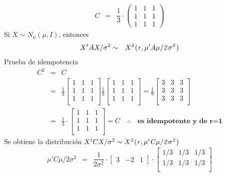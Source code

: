 \documentclass[12pt,a4paper]{report}
\begin{document}
\begin{enumerate}
	 \begin{eqnarray*} C&=& \dfrac{1}{3} \cdot
	 	\begin{pmatrix} 1 & 1 & 1 \\
	 		 			1 & 1 & 1 \\ 1 & 1 & 1 
		\end{pmatrix}
	 \end{eqnarray*}
Si $X\sim N_{n}(\mu, I)$, entonces
	 \begin{eqnarray*}
	 	X^{t}AX/\sigma^{2}&\sim& \it{X^{2}}(r,\mu'A\mu/2\sigma^{2})
	 \end{eqnarray*}
Prueba de idempotencia	 
	 \begin{eqnarray*}
	 	C^{2}&=& C\\
	 	&=&\frac{1}{3}  \begin{bmatrix}
	 		1 & 1 & 1\\
	 		1 & 1 & 1\\
	 		1 & 1 & 1\\
	 	\end{bmatrix}	
	 	\frac{1}{3}  \begin{bmatrix}
	 		1 & 1 & 1\\
	 		1 & 1 & 1\\
	 		1 & 1 & 1\\
	 	\end{bmatrix}
	 	=	\frac{1}{9}	\begin{bmatrix}
	 		3 & 3 & 3\\
	 		3 & 3 & 3\\
	 		3 & 3 & 3\\
	 	\end{bmatrix} \\
	 	&=&	\frac{1}{3} \cdot \begin{bmatrix}
	 		1 & 1 & 1\\
	 		1 & 1 & 1\\
	 		1 & 1 & 1\\
	 	\end{bmatrix} =C \quad \therefore \quad \textbf{es idempotente y de r=1}
	 \end{eqnarray*}
Se obtiene la distribución $X^{t}CX/\sigma^{2}\sim \it{X^{2}}(r,\mu'C\mu/2\sigma^{2})$
	\begin{eqnarray*}
		\mu'C\mu/2\sigma^{2} &=&\dfrac{1}{2\sigma^{2}} \cdot \begin{bmatrix}
			3 & -2 & 1
		\end{bmatrix}	
		\cdot 
		\begin{bmatrix}
			1/3 & 1/3 & 1/3\\
			1/3 & 1/3 & 1/3\\

\end{bmatrix}
\end{eqnarray*}
\end{enumerate}
\end{document}
